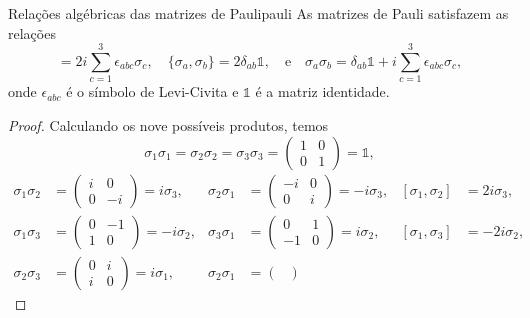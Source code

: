 \begin{proposition}{Relações algébricas das matrizes de Pauli}{pauli}
    As matrizes de Pauli satisfazem as relações
    \begin{equation*}
        [\sigma_a,\sigma_b] = 2i \sum_{c = 1}^3 \epsilon_{abc}\sigma_c,\quad
        \{\sigma_a, \sigma_b\} = 2\delta_{ab} \mathds{1},\quad\text{e}\quad
        \sigma_a \sigma_b = \delta_{ab} \mathds{1} + i \sum_{c = 1}^3 \epsilon_{abc}\sigma_c,
    \end{equation*}
    onde \(\epsilon_{abc}\) é o símbolo de Levi-Civita e \(\mathds{1}\) é a matriz identidade.
\end{proposition}
\begin{proof}
    Calculando os nove possíveis produtos, temos
    \begin{equation*}
        \sigma_1 \sigma_1 = \sigma_2 \sigma_2 = \sigma_3 \sigma_3 = \begin{pmatrix}
            1&0\\0&1
        \end{pmatrix} = \mathds{1},
    \end{equation*}
    \begin{align*}
        \sigma_1 \sigma_2 &= \begin{pmatrix}
            i&0\\0&-i
        \end{pmatrix} = i \sigma_3,&
        \sigma_2 \sigma_1 &= \begin{pmatrix}
            -i&0\\0&i
        \end{pmatrix} = -i \sigma_3,&
            [\sigma_1, \sigma_2] &= 2i \sigma_3,\\
        \sigma_1 \sigma_3 &= \begin{pmatrix}
            0&-1\\1&0
        \end{pmatrix} = -i \sigma_2,&
        \sigma_3 \sigma_1 &= \begin{pmatrix}
            0&1\\-1&0
        \end{pmatrix} = i \sigma_2,&
            [\sigma_1, \sigma_3] &= -2i \sigma_2,\\
        \sigma_2 \sigma_3 &= \begin{pmatrix}
            0&i\\i&0
        \end{pmatrix} = i \sigma_1,&
        \sigma_2 \sigma_1 &= \begin{pmatrix}

\end{pmatrix}
\end{align*}
\end{proof}
